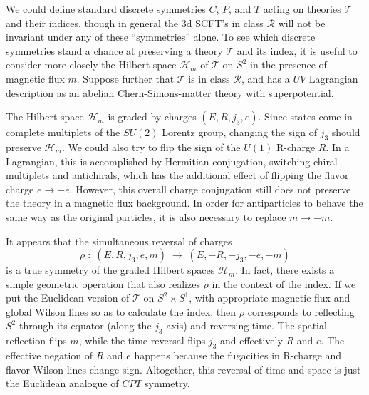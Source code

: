 \documentclass[11pt,letterpaper]{article}
\numberwithin{equation}{section}
\newcommand{\be}{\begin{equation}}
\newcommand{\ee}{\end{equation}}
\newcommand{\CH}{\mathcal{H}}
\newcommand{\CR}{\mathcal{R}}
\newcommand{\CT}{\mathcal{T}}
\begin{document}
We could define standard discrete symmetries $C$, $P$, and $T$ acting on theories $\CT$ and their indices, though in general the 3d SCFT's in class $\CR$ will not be invariant under any of these ``symmetries'' alone. To see which discrete symmetries stand a chance at preserving a theory $\CT$ and its index, it is useful to consider more closely the Hilbert space $\CH_m$ of $\CT$ on $S^2$ in the presence of magnetic flux $m$. Suppose further that $\CT$ is in class $\CR$, and has a $UV$ Lagrangian description as an abelian Chern-Simons-matter theory with superpotential.

The Hilbert space $\CH_m$ is graded by charges $(E,R,j_3,e)$. Since states come in complete multiplets of the $SU(2)$ Lorentz group, changing the sign of $j_3$ should preserve $\CH_m$. We could also try to flip the sign of the $U(1)$ R-charge $R$. In a Lagrangian, this is accomplished by Hermitian conjugation, switching chiral multiplets and antichirals, which  has the additional effect of flipping the flavor charge $e\to -e$. However, this overall charge conjugation still does not preserve the theory in a magnetic flux background. In order for antiparticles to behave the same way as the original particles, it is also necessary to replace $m\to -m$.

It appears that the simultaneous reversal of charges
%
\be \rho \;:\; (E,R,j_3,e,m)\;\to\;(E,-R,-j_3,-e,-m) \ee
%
is a true symmetry of the graded Hilbert spaces $\CH_m$. In fact, there exists a simple geometric operation that also realizes $\rho$ in the context of the index. If we put the Euclidean version of $\CT$ on $S^2\times S^1$, with appropriate magnetic flux and global Wilson lines so as to calculate the index, then $\rho$ corresponds to reflecting $S^2$ through its equator (along the $j_3$ axis) and reversing time. The spatial reflection flips $m$, while the time reversal flips $j_3$ and effectively $R$ and $e$. The effective negation of $R$ and $e$ happens because the fugacities in R-charge and flavor Wilson lines change sign. Altogether, this reversal of time and space is just the Euclidean analogue of $CPT$ symmetry.
\end{document}
